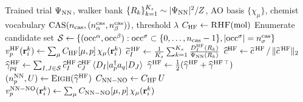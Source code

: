 \documentclass[journal=jctcce,manuscript=suppinfo,layout=traditional]{achemso}
\begin{document}
\begin{algorithm}[h]
\caption{NN-VMC $\to$ chemist-language CI vector via the
\textsc{OmegaQMC.cs} framework. The only mean-field input is one
RHF SCF cycle; no CASSCF, CASCI, or FCI is invoked. All
downstream observables (NTOs, NEVPT2, 1-/2-RDM properties) follow
from the returned $\widehat c^{\rm NN-NO,\, Lasso}$ and
$C_{\rm NN-NO}$.}
\label{alg:framework}
\begin{algorithmic}[1]
\Require Trained trial $\Psi_{\rm NN}$, walker bank
         $\{R_k\}_{k=1}^{K_s} \sim |\Psi_{\rm NN}|^2/Z$,
         AO basis $\{\chi_\mu\}$, chemist vocabulary
         $\mathrm{CAS}(n_{\rm cas},(n_\alpha^{\rm cas},n_\beta^{\rm cas}))$,
         threshold $\lambda$
\State $C_{\rm HF} \gets \textsc{RHF}(\mathrm{mol})$
\State Enumerate candidate set $\mathcal{S} \gets
       \{ (\mathrm{occ}^\alpha,\mathrm{occ}^\beta) :
          \mathrm{occ}^\sigma \subset \{0,\dots,n_{\rm cas}-1\},
          |\mathrm{occ}^\sigma| = n_\sigma^{\rm cas} \}$
\State $v^{\rm HF}_p(\mathbf{r}_i^k) \gets
       \sum_\mu C_{\rm HF}[\mu,p]\,\chi_\mu(\mathbf{r}_i^k)$
  \State $\widetilde c_I^{\,\rm HF} \gets
         \frac{1}{K_s}\sum_{k=1}^{K_s}
         \frac{D_I^{\rm HF}(R_k)}{\Psi_{\rm NN}(R_k)}$
\EndFor
\State $\widehat c^{\rm HF} \gets
       \widetilde c^{\,\rm HF} \,/\, \|\widetilde c^{\,\rm HF}\|_2$
\State $\widehat \gamma^{\rm HF}_{pq} \gets
       \sum_{I,J \in \mathcal{S}}
       \widehat c^{\rm HF}_I \, \widehat c^{\rm HF}_J \,
       \langle D_I | a_p^\dagger a_q | D_J \rangle$
\State $\widehat \gamma^{\rm HF} \gets
       \tfrac{1}{2}(\widehat \gamma^{\rm HF} +
                    \widehat \gamma^{\rm HF\,\top})$
\State $(n_p^{\rm NN}, U) \gets
       \textsc{Eigh}(\widehat \gamma^{\rm HF})$
\State $C_{\rm NN-NO} \gets C_{\rm HF}\,U$
\State $v^{\rm NN-NO}_p(\mathbf{r}_i^k) \gets
       \sum_\mu C_{\rm NN-NO}[\mu,p]\,\chi_\mu(\mathbf{r}_i^k)$

\end{algorithmic}
\end{algorithm}
\end{document}
